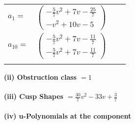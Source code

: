 \documentclass[1p]{elsarticle_modified}
\theoremstyle{definition}
\begin{document}
\begin{tabular}{m{7pt} m{180pt} m{7pt} m{180pt} }
\flushright $a_{1}=$&$\begin{pmatrix}-\frac{5}{7} v^2+7 v-\frac{25}{7}\\- v^2+10 v-5\end{pmatrix}$ \\
\flushright $a_{10}=$&$\begin{pmatrix}-\frac{5}{7} v^2+7 v-\frac{11}{7}\\-\frac{5}{7} v^2+7 v-\frac{11}{7}\end{pmatrix}$\\&\end{tabular}
\flushleft \textbf{(ii) Obstruction class $= 1$}\\~\\
\flushleft \textbf{(iii) Cusp Shapes $= \frac{30}{7} v^2-33 v+\frac{3}{7}$}\\~\\
\newpage\renewcommand{\arraystretch}{1}
\flushleft \textbf{(iv) u-Polynomials at the component}\newline \\
\end{document}
